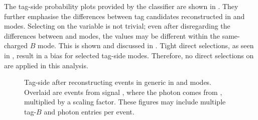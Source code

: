 The tag-side probability plots provided by the \FEI classifier are shown in .
They further emphasise the differences between tag candidates reconstructed in \feiBp and \feiBz modes.
Selecting on the \feiProb variable is not trivial;
even after disregarding the differences between \feiBp and \feiBz modes, 
the \feiProb values may be different within the same-charged $B$ mode.
This is shown and discussed in .
Tight direct selections, as seen in , result in a bias for selected tag-side modes.
Therefore, no direct selections on \feiProb are applied in this analysis.

\begin{figure}[htbp!]
    \centering
    \caption{\label{fig:sigprob_after_reco} Tag-side \feiProb after reconstructing \BtoXsgamma events in generic \MC in \feiBp and \feiBz modes.
    Overlaid are events from signal \MC, where the photon comes from \BtoXsgamma, multiplied by a scaling factor.
    These figures may include multiple tag-$B$ and photon entries per event.
    }
\end{figure}

